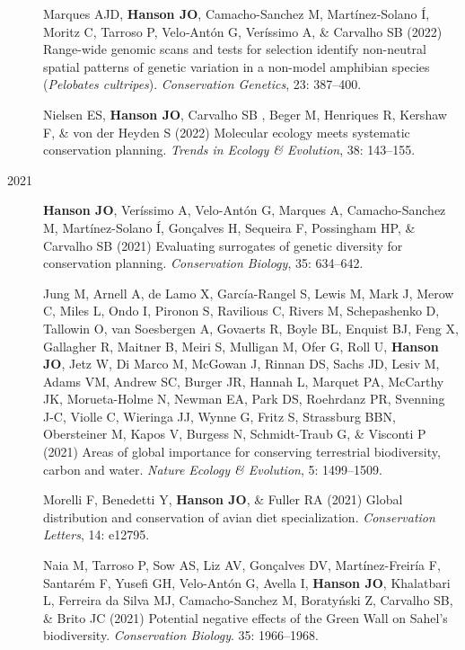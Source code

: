 \documentclass[12pt,a4paper]{article}
\begin{document}
\begin{description}
\item[] Marques AJD, \textbf{Hanson JO}, Camacho-Sanchez M, Martínez‐Solano Í, Moritz C, Tarroso P, Velo‐Antón G, Veríssimo A, \& Carvalho SB (2022) Range-wide genomic scans and tests for selection identify non-neutral spatial patterns of genetic variation in a non-model amphibian species (\textit{Pelobates cultripes}). \textit{Conservation Genetics}, 23: 387--400.

\item[] Nielsen ES, \textbf{Hanson JO}, Carvalho SB , Beger M, Henriques R, Kershaw F, \& von der Heyden S (2022) Molecular ecology meets systematic conservation planning. \textit{Trends in Ecology \& Evolution}, 38: 143--155.

\item[2021] \textbf{Hanson JO}, Veríssimo A, Velo-Antón G, Marques A, Camacho-Sanchez M, Martínez-Solano Í, Gonçalves H, Sequeira F, Possingham HP, \& Carvalho SB (2021) Evaluating surrogates of genetic diversity for conservation planning. \textit{Conservation Biology}, 35: 634--642.

\item[] Jung M, Arnell A, de Lamo X, García-Rangel S, Lewis M, Mark J, Merow C, Miles L, Ondo I, Pironon S, Ravilious C, Rivers M, Schepashenko D, Tallowin O, van Soesbergen A, Govaerts R, Boyle BL, Enquist BJ, Feng X, Gallagher R, Maitner B, Meiri S, Mulligan M, Ofer G, Roll U, \textbf{Hanson JO}, Jetz W, Di Marco M, McGowan J, Rinnan DS, Sachs JD, Lesiv M, Adams VM, Andrew SC, Burger JR, Hannah L, Marquet PA, McCarthy JK, Morueta-Holme N, Newman EA, Park DS, Roehrdanz PR, Svenning J-C, Violle C, Wieringa JJ, Wynne G, Fritz S, Strassburg BBN, Obersteiner M, Kapos V, Burgess N, Schmidt-Traub G, \& Visconti P (2021) Areas of global importance for conserving terrestrial biodiversity, carbon and water. \textit{Nature Ecology \& Evolution}, 5: 1499--1509.

\item[] Morelli F, Benedetti Y, \textbf{Hanson JO}, \& Fuller RA (2021) Global distribution and conservation of avian diet specialization. \textit{Conservation Letters}, 14: e12795.

\item[] Naia M, Tarroso P, Sow AS, Liz AV, Gonçalves DV, Martínez-Freiría F, Santarém F, Yusefi GH, Velo-Antón G, Avella I, \textbf{Hanson JO}, Khalatbari L, Ferreira da Silva MJ, Camacho-Sanchez M, Boratyński Z, Carvalho SB, \& Brito JC (2021) Potential negative effects of the Green Wall on Sahel's biodiversity. \textit{Conservation Biology}. 35: 1966--1968.


\end{description}
\end{document}

